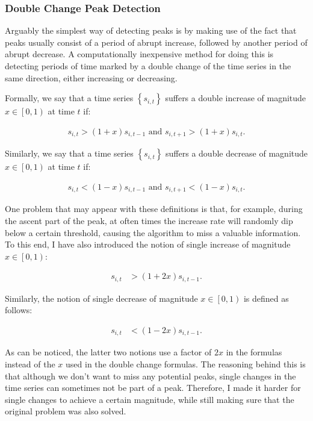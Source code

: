 \subsubsection{Double Change Peak Detection}

Arguably the simplest way of detecting peaks is by making use of the fact that peaks usually consist of a period of abrupt increase, followed by another period of abrupt decrease. A computationally inexpensive method for doing this is detecting periods of time marked by a double change of the time series in the same direction, either increasing or decreasing.

Formally, we say that a time series $\left\{ s_{i, t} \right\}$ suffers a double increase of magnitude $x \in \left[ 0, 1 \right)$ at time $t$ if:

\begin{align}
\label{eq:double-increase}
s_{i, t} > \left( 1 + x \right) s_{i, t - 1} \textrm{ and } s_{i, t + 1} > \left( 1 + x \right) s_{i, t}.
\end{align}

Similarly, we say that a time series $\left\{ s_{i, t} \right\}$ suffers a double decrease of magnitude $x \in \left[ 0, 1 \right)$ at time $t$ if:

\begin{align}
\label{eq:double-decrease}
s_{i, t} < \left( 1 - x \right) s_{i, t - 1} \textrm{ and } s_{i, t + 1} < \left( 1 - x \right) s_{i, t}.
\end{align}

One problem that may appear with these definitions is that, for example, during the ascent part of the peak, at often times the increase rate will randomly dip below a certain threshold, causing the algorithm to miss a valuable information. To this end, I have also introduced the notion of single increase of magnitude $x \in \left[ 0, 1 \right)$:

\begin{align}
\label{eq:single-increase}
s_{i, t} &> \left( 1 + 2x \right) s_{i, t - 1}.
\end{align}

Similarly, the notion of single decrease of magnitude $x \in \left[ 0, 1 \right)$ is defined as follows:

\begin{align}
\label{eq:single-decrease}
s_{i, t} &< \left( 1 - 2x \right) s_{i, t - 1}.
\end{align}

As can be noticed, the latter two notions use a factor of $2x$ in the formulas instead of the $x$ used in the double change formulas. The reasoning behind this is that although we don't want to miss any potential peaks, single changes in the time series can sometimes not be part of a peak. Therefore, I made it harder for single changes to achieve a certain magnitude, while still making sure that the original problem was also solved.


